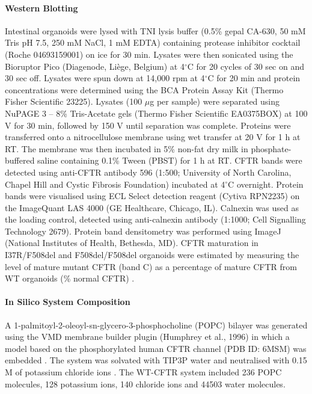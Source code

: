 \paragraph{Western Blotting} Intestinal organoids were lysed with TNI lysis buffer (0.5\% gepal CA-630, 50 mM Tris pH 7.5, 250 mM NaCl, 1 mM EDTA) \cite{pankow2015} containing protease inhibitor cocktail (Roche 04693159001) on ice for 30 min. Lysates were then sonicated using the Bioruptor Pico (Diagenode, Li\`ege, Belgium) at 4$^\circ$C for 20 cycles of 30 sec on and 30 sec off. Lysates were spun down at 14,000 rpm at 4$^\circ$C for 20 min and protein concentrations were determined using the BCA Protein Assay Kit (Thermo Fisher Scientific 23225). Lysates (100 $\mu$g per sample) were separated using NuPAGE 3 – 8\% Tris-Acetate gels (Thermo Fisher Scientific EA0375BOX) at 100 V for 30 min, followed by 150 V until separation was complete. Proteins were transferred onto a nitrocellulose membrane using wet transfer at 20 V for 1 h at RT. The membrane was then incubated in 5\% non-fat dry milk in phosphate-buffered saline containing 0.1\% Tween (PBST) for 1 h at RT. CFTR bands were detected using anti-CFTR antibody 596 (1:500; University of North Carolina, Chapel Hill and Cystic Fibrosis Foundation) incubated at 4$^\circ$C overnight. Protein bands were visualised using ECL Select detection reagent (Cytiva RPN2235) on the ImageQuant LAS 4000 (GE Healthcare, Chicago, IL). Calnexin was used as the loading control, detected using anti-calnexin antibody (1:1000; Cell Signalling Technology 2679). Protein band densitometry was performed using ImageJ (National Institutes of Health, Bethesda, MD). CFTR maturation in I37R/F508del and F508del/F508del organoids were estimated by measuring the level of mature mutant CFTR (band C) as a percentage of mature CFTR from WT organoids (\% normal CFTR) \cite{vangoor2014}.

\paragraph{In Silico System Composition} A 1-palmitoyl-2-oleoyl-sn-glycero-3-phosphocholine (POPC) bilayer was generated using the VMD membrane builder plugin (Humphrey et al., 1996) in which a model based on the phosphorylated human CFTR channel (PDB ID: 6MSM) was embedded \cite{zhang2018a}. The system was solvated with TIP3P water and neutralised with 0.15 M of potassium chloride ions \cite{mark2001}. The WT-CFTR system included 236 POPC molecules, 128 potassium ions, 140 chloride ions and 44503 water molecules.

